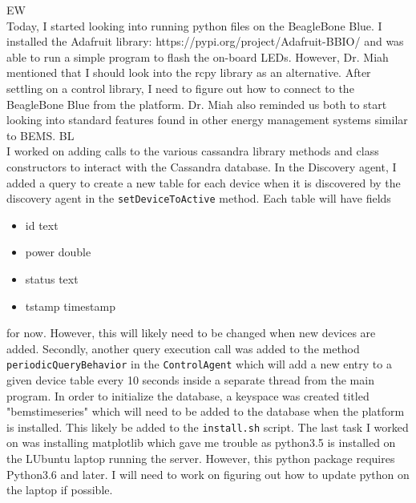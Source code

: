 \documentclass[fontsize=11pt, %
                             paper=letter, %
                             openany, %
                             captions=tableheading,
                             index=totoc,
                             hyperref]{labbook}
\begin{document}
EW\\
Today, I started looking into running python files on the BeagleBone Blue. I installed the Adafruit library: https://pypi.org/project/Adafruit-BBIO/ and was able to run a simple program to flash the on-board LEDs. However, Dr. Miah mentioned that I should look into the rcpy library as an alternative. After settling on a control library, I need to figure out how to connect to the BeagleBone Blue from the platform.
Dr. Miah also reminded us both to start looking into standard features found in other energy management systems similar to BEMS.
\medbreak\noindent
BL\\
I worked on adding calls to the various cassandra library methods and class constructors to interact with the Cassandra database. In the Discovery agent, I added a query to create a new table for each device when it is discovered by the discovery agent in the \texttt{setDeviceToActive} method. Each table will have fields
\begin{itemize}
\item id text
\item power double
\item status text
\item tstamp timestamp
\end{itemize}
for now. However, this will likely need to be changed when new devices are added. Secondly, another query execution call was added to the method \texttt{periodicQueryBehavior} in the \texttt{ControlAgent} which will add a new entry to a given device table every 10 seconds inside a separate thread from the main program. In order to initialize the database, a keyspace was created titled "bemstimeseries" which will need to be added to the database when the platform is installed. This likely be added to the \texttt{install.sh} script. The last task I worked on was installing matplotlib which gave me trouble as python3.5 is installed on the LUbuntu laptop running the server. However, this python package requires Python3.6 and later. I will need to work on figuring out how to update python on the laptop if possible. 
\end{document}
